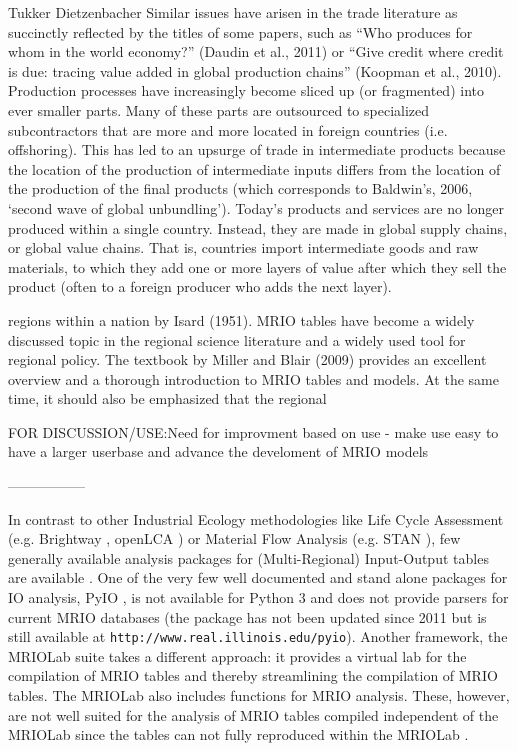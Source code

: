 \documentclass{jors}
\begin{document}
{Tukker Dietzenbacher
Similar issues have arisen in the trade literature as succinctly reflected by the titles of some
papers, such as “Who produces for whom in the world economy?” (Daudin et al., 2011) or
“Give credit where credit is due: tracing value added in global production chains” (Koopman
et al., 2010). Production processes have increasingly become sliced up (or fragmented) into
ever smaller parts. Many of these parts are outsourced to specialized subcontractors that
are more and more located in foreign countries (i.e. offshoring). This has led to an upsurge
of trade in intermediate products because the location of the production of intermediate
inputs differs from the location of the production of the final products (which corresponds
to Baldwin’s, 2006, ‘second wave of global unbundling’). Today’s products and services are
no longer produced within a single country. Instead, they are made in global supply chains,
or global value chains. That is, countries import intermediate goods and raw materials, to
which they add one or more layers of value after which they sell the product (often to a
foreign producer who adds the next layer).

regions within a nation by Isard (1951). MRIO tables have become a widely discussed topic
in the regional science literature and a widely used tool for regional policy. The textbook
by Miller and Blair (2009) provides an excellent overview and a thorough introduction to
MRIO tables and models. At the same time, it should also be emphasized that the regional

FOR DISCUSSION/USE:Need for improvment based on use - make use easy to have a larger userbase and advance the develoment of MRIO models

-----------------

In contrast to other Industrial Ecology methodologies like 
Life Cycle Assessment (e.g. Brightway \cite{mutel2017}, openLCA \cite{openlca2018})
or Material Flow Analysis (e.g. STAN \cite{cencic2008}), 
few generally available analysis packages for (Multi-Regional) Input-Output tables are available \cite{pauliuk2015}. One of the very few well documented and stand alone packages for IO analysis, PyIO \cite{nazara2003}, is not available for Python 3 and does not provide parsers for current MRIO databases (the package has not been updated since 2011 but is still available at \texttt{http://www.real.illinois.edu/pyio}). Another framework, the MRIOLab suite \cite{geschke2017,lenzen2017} takes a different approach: it provides a virtual lab for the compilation of MRIO tables and thereby streamlining the compilation of MRIO tables. The MRIOLab also includes functions for MRIO analysis. These, however, are not well suited for the analysis of MRIO tables compiled independent of the MRIOLab since the tables can not fully reproduced within the MRIOLab \cite{rahman2017,reyes2017}.

}
\end{document}
